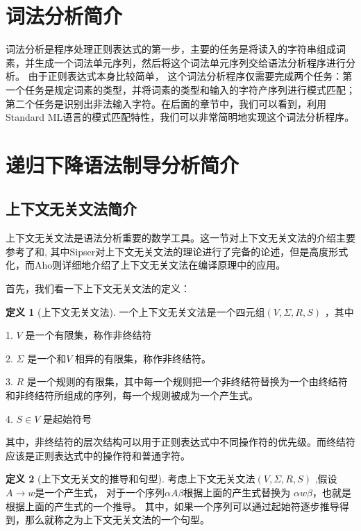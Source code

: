 \documentclass[openany,oneside]{book}
\theoremstyle{definition}
\newtheorem{definition}{\hspace{2em}定义}[chapter]
\theoremstyle{definition}
\begin{document}
	\section{词法分析简介}
	词法分析是程序处理正则表达式的第一步，主要的任务是将读入的字符串组成词素，并生成一个词法单元序列，然后将这个词法单元序列交给语法分析程序进行分析。\cite{appel2004modern} 由于正则表达式本身比较简单， 这个词法分析程序仅需要完成两个任务：第一个任务是规定词素的类型，并将词素的类型和输入的字符产序列进行模式匹配；第二个任务是识别出非法输入字符。在后面的章节中，我们可以看到，利用Standard ML语言的模式匹配特性，我们可以非常简明地实现这个词法分析程序。
	\section{递归下降语法制导分析简介}
	
	\subsection{上下文无关文法简介}
	上下文无关文法是语法分析重要的数学工具。这一节对上下文无关文法的介绍主要参考了\cite{2002编译原理}和\cite{Sips05a}, 其中Sipser\cite{Sips05a}对上下文无关文法的理论进行了完备的论述，但是高度形式化，而Aho\cite{2002编译原理}则详细地介绍了上下文无关文法在编译原理中的应用。
	
	首先，我们看一下上下文无关文法的定义：
	\begin{definition}[上下文无关文法]
		一个上下文无关文法是一个四元组\(\left( V, \Sigma , R , S \right) \) ，其中
		
		1. \(V\) 是一个有限集，称作非终结符
		
		2. \(\Sigma\) 是一个和\(V\) 相异的有限集，称作非终结符。
		
		3. \(R\) 是一个规则的有限集，其中每一个规则把一个非终结符替换为一个由终结符和非终结符所组成的序列，每一个规则被成为一个产生式。
		
		4. \( S \in V\) 是起始符号
		
	\end{definition}
	 其中，非终结符的层次结构可以用于正则表达式中不同操作符的优先级。而终结符应该是正则表达式中的操作符和普通字符。
	 
	 
	 \begin{definition}[上下文无关文的推导和句型]
	 	考虑上下文无关文法\(\left( V, \Sigma , R , S \right) \) ,假设\(A \rightarrow w\)是一个产生式， 对于一个序列\(\alpha A \beta\)根据上面的产生式替换为 \(\alpha w \beta\)，也就是根据上面的产生式的一个推导。
	 	其中，如果一个序列可以通过起始符逐步推导得到，那么就称之为上下文无关文法的一个句型。
	 \end{definition}
 
\end{document}
